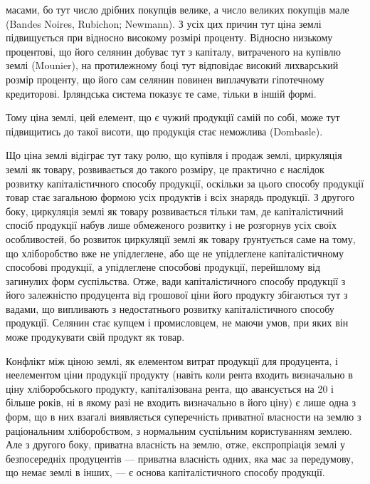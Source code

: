 масами, бо тут число дрібних покупців велике, а число великих покупців мале
(Bandes Noires, Rubichon; Newmann). З усіх цих причин тут ціна землі підвищується
при відносно високому розмірі проценту. Відносно низькому процентові,
що його селянин добуває тут з капіталу, витраченого на купівлю землі (Mounier),
на протилежному боці тут відповідає високий лихварський розмір проценту,
що його сам селянин повинен виплачувати гіпотечному кредиторові. Ірляндська
система показує те саме, тільки в іншій формі.

Тому ціна землі, цей елемент, що є чужий продукції самій по собі, може
тут підвищитись до такої висоти, що продукція стає неможлива (Dombasle).

Що ціна землі відіграє тут таку ролю, що купівля і продаж землі, циркуляція
землі як товару, розвивається до такого розміру, це практично є наслідок
розвитку капіталістичного способу продукції, оскільки за цього способу продукції
товар стає загальною формою усіх продуктів і всіх знарядь продукції. З другого
боку, циркуляція землі як товару розвивається тільки там, де капіталістичний
спосіб продукції набув лише обмеженого розвитку і не розгорнув усіх своїх
особливостей, бо розвиток циркуляції землі як товару ґрунтується саме на тому,
що хліборобство вже не упідлеглене, або ще не упідлеглене капіталістичному
способові продукції, а упідлеглене способові продукції, перейшлому від загинулих
форм суспільства. Отже, вади капіталістичного способу продукції з його
залежністю продуцента від грошової ціни його продукту збігаються тут з вадами,
що випливають з недостатнього розвитку капіталістичного способу продукції.
Селянин стає купцем і промисловцем, не маючи умов, при яких він може продукувати
свій продукт як товар.

Конфлікт між ціною землі, як елементом витрат продукції для продуцента,
і неелементом ціни продукції продукту (навіть коли рента входить визначально
в ціну хліборобського продукту, капіталізована рента, що авансується на 20
і більше років, ні в якому разі не входить визначально в його ціну) є лише
одна з форм, що в них взагалі виявляється суперечність приватної власности на
землю з раціональним хліборобством, з нормальним суспільним користуванням
землею. Але з другого боку, приватна власність на землю, отже, експропріація
землі у безпосередніх продуцентів — приватна власність одних, яка має
за передумову, що немає землі в інших, — є основа капіталістичного способу
продукції.

